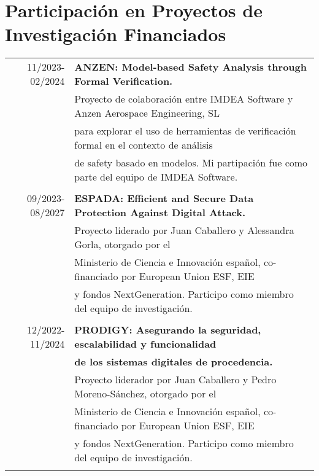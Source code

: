 \documentclass[a4paper,10pt]{article} %
\begin{document}
\section{Participación en Proyectos de Investigación Financiados}
\begin{longtable}{rl}

\textsc{11/2023-02/2024} & \textbf{ANZEN: Model-based Safety Analysis through Formal Verification.} \\ 
& Proyecto de colaboración entre IMDEA Software y Anzen Aerospace Engineering, SL \\
&  para explorar el uso de herramientas de verificación formal en el contexto de análisis \\
&  de safety basado en modelos. Mi partipación fue como parte del equipo de IMDEA Software. \\ & \\

\textsc{09/2023-08/2027} & \textbf{ESPADA: Efficient and Secure Data Protection Against Digital Attack.} \\ 
& Proyecto liderado por Juan Caballero y Alessandra Gorla, otorgado por el \\ 
& Ministerio de Ciencia e Innovación español, co-financiado por European Union ESF, EIE \\
& y fondos NextGeneration. Participo como miembro del equipo de investigación. \\ & \\

\textsc{12/2022-11/2024} & \textbf{PRODIGY: Asegurando la seguridad, escalabilidad y funcionalidad} \\
& \textbf{de los sistemas digitales de procedencia.} \\ 
& Proyecto liderador por Juan Caballero y Pedro Moreno-Sánchez, otorgado por el \\
& Ministerio de Ciencia e Innovación español, co-financiado por European Union ESF, EIE \\
& y fondos NextGeneration. Participo como miembro del equipo de investigación. \\ & \\

\end{longtable}
\end{document}
